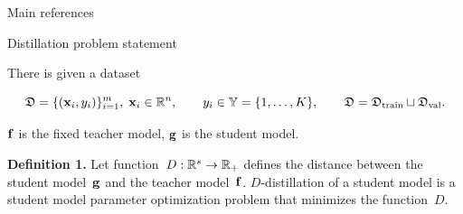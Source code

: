 \documentclass[12pt, aspectratio=169]{beamer}
\begin{document}










\begin{frame}{Main references}
    \printbibliography
\end{frame}

\begin{frame}{Distillation problem statement}
\begin{block}{There is given a dataset}
\vspace{-0.5 cm}

$$\mathfrak{D} = \{(\mathbf{x}_i, y_i)\}_{i=1}^{m},\; \mathbf{x}_i \in \mathbb{R}^n,\qquad y_i \in \mathbb{Y} = \{1, \dots, K\},\qquad \mathfrak{D} = \mathfrak{D}_\text{train} \sqcup \mathfrak{D}_\text{val}.$$
\end{block}

\vspace{-0.3 cm}
$\mathbf{f}$ is the fixed teacher model, $\mathbf{g}$ is the student model.
\vspace{1 cm}

\textbf{Definition 1.}
Let function~$D: \mathbb{R}^s \to \mathbb{R}_{+}$ defines the distance between the student model~$\mathbf{g}$ and the teacher model~$\mathbf{f}$. $D$-distillation of a student model is a student model parameter optimization problem that minimizes the function~$D$.
\end{frame}
\end{document}
